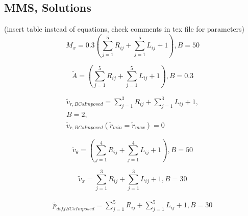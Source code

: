 

\subsection{MMS, Solutions} 

(insert table instead of equations, check comments in tex file for parameters)
\begin{equation}
    M_x = 0.3 \left(
    \sum_{j=1}^5 R_{ij} +
    \sum_{j=1}^5 L_{ij} + 1
    \right) , B = 50
    \label{eqn:MMS_M_x}
\end{equation}

\begin{equation}
    \tilde{A} = \left(
    \sum_{j=1}^5 R_{ij} +
    \sum_{j=1}^5 L_{ij} + 1
    \right) , B = 0.3
    \label{eqn:MMS_A}
\end{equation}

\begin{align}
    \tilde{v}_{r,BCsImposed} = 
    \sum_{j=1}^3 R_{ij} +
    \sum_{j=1}^3 L_{ij} + 1, \\
    B = 2 , \\ 
    \tilde{v}_{r,BCsImposed}(\tilde{r}_{min}=\tilde{r}_{max}) = 0
    \label{eqn:MMS_vTh}
\end{align}

\begin{equation}
    \tilde{v}_{\theta} = \left(
    \sum_{j=1}^4 R_{ij} +
    \sum_{j=1}^4 L_{ij} + 1
    \right) , B = 50 
    \label{eqn:MMS_vTh}
\end{equation}

\begin{equation}
    \tilde{v}_{x} = 
    \sum_{j=1}^3 R_{ij} +
    \sum_{j=1}^3 L_{ij} + 1
    , B = 30 
    \label{eqn:MMS_vX}
\end{equation}

\begin{align}
    \tilde{p}_{diffBCsImposed} = 
    \sum_{j=1}^5 R_{ij} +
    \sum_{j=1}^5 L_{ij} + 1
    , B = 30 
    \label{eqn:MMS_p}
\end{align}

